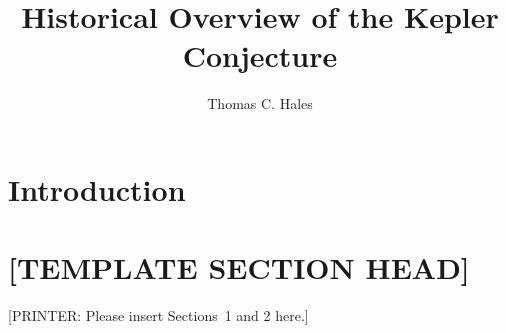 \documentclass[11pt]{amsart}
\title{Historical Overview of the Kepler Conjecture}
\author{Thomas C. Hales}
\begin{document}
\begin{abstract}

\end{abstract}

\maketitle

\section*{Introduction}



\section*{[TEMPLATE SECTION HEAD]}

[PRINTER: Please insert Sections~1 and 2 here.]





\begin{thebibliography}{CHMS94}



\end{thebibliography}
\end{document}
